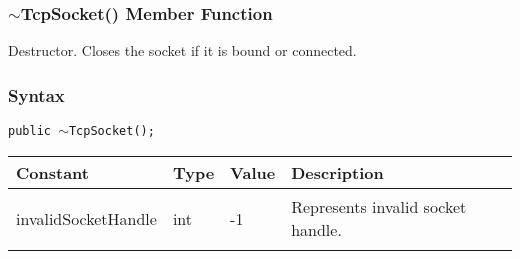\documentclass[a4paper,oneside,11.000000pt]{book}
\newcounter{subchapter}
\begin{document}
\hypertarget{System.Net.Sockets.TcpSocket.destructor.P.System.Net.Sockets.TcpSocket}{\subsubsection*{$\sim$TcpSocket() Member Function}}
\begin{flushleft}
Destructor. Closes the socket if it is bound or connected.

\end{flushleft}
\subsubsection*{Syntax}\texttt{public $\sim$TcpSocket();}
\clearpage

\begin{flushleft}
\begin{supertabular}[l]{llll}
\textbf{Constant}
& \textbf{Type}
& \textbf{Value}
& \textbf{Description}
\\
\hline
\hypertarget{System.Net.Sockets.invalidSocketHandle}{invalidSocketHandle}
& int
& -1
& Represents invalid socket handle.

\\
\end{supertabular}

\end{flushleft}
\clearpage
\end{document}

